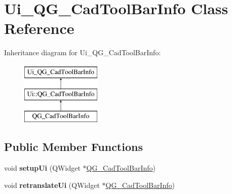 \hypertarget{classUi__QG__CadToolBarInfo}{\section{Ui\-\_\-\-Q\-G\-\_\-\-Cad\-Tool\-Bar\-Info Class Reference}
\label{classUi__QG__CadToolBarInfo}
}
Inheritance diagram for Ui\-\_\-\-Q\-G\-\_\-\-Cad\-Tool\-Bar\-Info\-:\begin{figure}[H]
\begin{center}
\leavevmode
\includegraphics[height=3.000000cm]{classUi__QG__CadToolBarInfo}
\end{center}
\end{figure}
\subsection*{Public Member Functions}
\begin{DoxyCompactItemize}
\item 
\hypertarget{classUi__QG__CadToolBarInfo_a93e30dedd40b8a9ec2d734c90b0163fa}{void {\bfseries setup\-Ui} (Q\-Widget $\ast$\hyperlink{classQG__CadToolBarInfo}{Q\-G\-\_\-\-Cad\-Tool\-Bar\-Info})}\label{classUi__QG__CadToolBarInfo_a93e30dedd40b8a9ec2d734c90b0163fa}

\item 
\hypertarget{classUi__QG__CadToolBarInfo_a12cd3b68d90615a2a43fa1b5e35903f7}{void {\bfseries retranslate\-Ui} (Q\-Widget $\ast$\hyperlink{classQG__CadToolBarInfo}{Q\-G\-\_\-\-Cad\-Tool\-Bar\-Info})}\label{classUi__QG__CadToolBarInfo_a12cd3b68d90615a2a43fa1b5e35903f7}

\end{DoxyCompactItemize}
